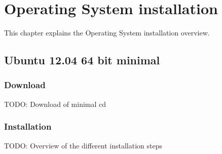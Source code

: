 

\chapter{Operating System installation}
This chapter explains the Operating System installation overview.

\section {Ubuntu 12.04 64 bit minimal}
\subsection {Download}
TODO: Download of minimal cd
\subsection {Installation}
TODO: Overview of the different installation steps

